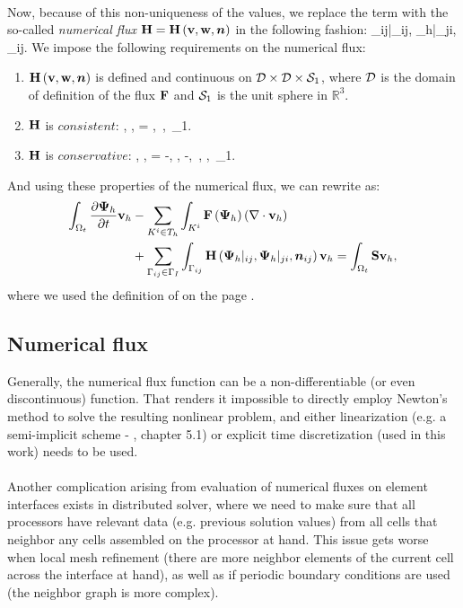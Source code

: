 \paragraph{}
Now, because of this non-uniqueness of the values, we replace the term  with the so-called \textit{numerical flux} $\mathrm{\mathbf{H}} = \mathrm{\mathbf{H}}\left(\mathrm{\mathbf{v}}, \mathrm{\mathbf{w}}, \mbox{\boldmath $n$}\right)$ in the following fashion:
\be
\label{NumFluxDef}
\lo\mrF{}\ro \cdot \bfn_{ij}\ro \mrvh \approx \mrH{}|_{ij}, {\mrPsi_h}|_{ji}, \bfn_{ij}\ro \mrvh.
\ee
We impose the following requirements on the numerical flux:
\begin{enumerate}
	\item $\mathrm{\mathbf{H}}\left( \mathrm{\mathbf{v}}, \mathrm{\mathbf{w}}, \mbox{\boldmath $n$}\right)$ is defined and continuous on $\mathcal{D} \times \mathcal{D} \times \mathcal{S}_1$, where $\mathcal{D}$ is the domain of definition of the flux $\mathrm{\mathbf{F}}$ and $\mathcal{S}_1$ is the unit sphere in $\mathbb{R}^3$.
	\item $\mathrm{\mathbf{H}}$ is $consistent$:
		\be
			\label{FluxConsistent} \mrH\lo \mrv, \mrv, \bfn\ro = \mrF\lo \mrv\ro \bfn,\ \mrv\in{},\ \bfn\in{}_1.
		\ee
	\item $\mathrm{\mathbf{H}}$ is $conservative$:
		\be
			\label{FluxConservative} \mrH\lo \mrv, \mrw, \bfn\ro = -\mrH\lo \mrw, \mrv, -\bfn\ro,\ \mrv, \mrw\in{},\ \bfn\in{}_1.
		\ee
 \end{enumerate}

And using these properties of the numerical flux, we can rewrite  as:
\begin{align}
    \label{DG2} \int_{\Omega_{t}} \frac{\partial{{\mathrm{\mathbf{\Psi}}_h}}}{\partial{t}} \mathrm{\mathbf{v}}_h & - \sum_{K^i \in T_h}\int_{K^i}\mathrm{\mathbf{F}}\left({\mathrm{\mathbf{\Psi}}_h}\right) \left(\nabla \cdot \mathrm{\mathbf{v}}_h\right)\\
    \nonumber & + \sum_{\Gamma_{ij}\in\Gamma_I} \int_{\Gamma_{ij}} \mathrm{\mathbf{H}}\left({\mathrm{\mathbf{\Psi}}_h}|_{ij}, {\mathrm{\mathbf{\Psi}}_h}|_{ji}, \mbox{\boldmath $n$}_{ij}\right) \mathrm{\mathbf{v}}_h = \int_{\Omega_{t}} \mathrm{\mathbf{S}} \mathrm{\mathbf{v}}_h,
\end{align}
where we used the definition of  on the page \pageref{InternalEdges}.
\subsection{Numerical flux}
Generally, the numerical flux function can be a non-differentiable (or even discontinuous) function. That renders it impossible to directly employ Newton's method to solve the resulting nonlinear problem, and either linearization (e.g. a semi-implicit scheme - \cite{dolejsi2015}, chapter 5.1) or explicit time discretization (used in this work) needs to be used.
\paragraph{}
Another complication arising from evaluation of numerical fluxes on element interfaces exists in distributed solver, where we need to make sure that all processors have relevant data (e.g. previous solution values) from all cells that neighbor any cells assembled on the processor at hand. This issue gets worse when local mesh refinement (there are more neighbor elements of the current cell across the interface at hand), as well as if periodic boundary conditions are used (the neighbor graph is more complex).

